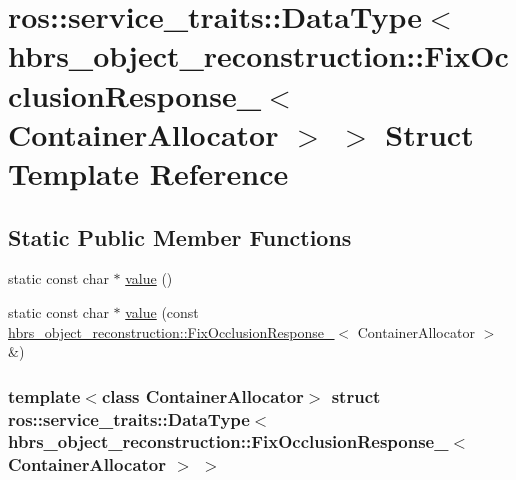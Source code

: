 \hypertarget{structros_1_1service__traits_1_1_data_type_3_01hbrs__object__reconstruction_1_1_fix_occlusion_re0f91c520351337ad88c972b291a5cc3a}{\section{ros\-:\-:service\-\_\-traits\-:\-:\-Data\-Type$<$ hbrs\-\_\-object\-\_\-reconstruction\-:\-:\-Fix\-Occlusion\-Response\-\_\-$<$ \-Container\-Allocator $>$ $>$ \-Struct \-Template \-Reference}
\label{structros_1_1service__traits_1_1_data_type_3_01hbrs__object__reconstruction_1_1_fix_occlusion_re0f91c520351337ad88c972b291a5cc3a}
}
\subsection*{\-Static \-Public \-Member \-Functions}
\begin{DoxyCompactItemize}
\item 
static const char $\ast$ \hyperlink{structros_1_1service__traits_1_1_data_type_3_01hbrs__object__reconstruction_1_1_fix_occlusion_re0f91c520351337ad88c972b291a5cc3a_a312cdb1ab0726792a4c8d11a22e967da}{value} ()
\item 
static const char $\ast$ \hyperlink{structros_1_1service__traits_1_1_data_type_3_01hbrs__object__reconstruction_1_1_fix_occlusion_re0f91c520351337ad88c972b291a5cc3a_a1e05aacf0735f6e94f70d547d55a458d}{value} (const \hyperlink{structhbrs__object__reconstruction_1_1_fix_occlusion_response__}{hbrs\-\_\-object\-\_\-reconstruction\-::\-Fix\-Occlusion\-Response\-\_\-}$<$ \-Container\-Allocator $>$ \&)
\end{DoxyCompactItemize}
\subsubsection*{template$<$class Container\-Allocator$>$ struct ros\-::service\-\_\-traits\-::\-Data\-Type$<$ hbrs\-\_\-object\-\_\-reconstruction\-::\-Fix\-Occlusion\-Response\-\_\-$<$ Container\-Allocator $>$ $>$}



